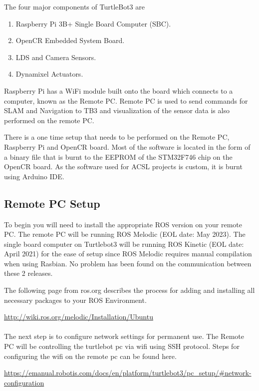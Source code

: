 \documentclass[12]{article}
\begin{document}
The four major components of TurtleBot3 are 
\begin{enumerate}
	\item {Raspberry Pi 3B+ Single Board Computer (SBC).}
	\item {OpenCR Embedded System Board.}
	\item {LDS and Camera Sensors.}
	\item {Dynamixel Actuators.}
\end{enumerate}

Raspberry Pi has a WiFi module built onto the board which connects to a computer, known as the Remote PC. Remote PC is used to send commands for SLAM and Navigation to TB3 and visualization of the sensor data is also performed on the remote PC.

There is a one time setup that needs to be performed on the Remote PC, Raspberry Pi and OpenCR board. Most of the software is located in the form of a binary file that is burnt to the EEPROM of the STM32F746 chip on the OpenCR board. As the software used for ACSL projects is custom, it is burnt using Arduino IDE.
 
\subsection{Remote PC Setup}

To begin you will need to install the appropriate ROS version on your remote PC. The remote PC will be running ROS Melodic (EOL date: May 2023). 
The single board computer on Turtlebot3 will be running ROS Kinetic (EOL date: April 2021) for the ease of setup since ROS Melodic requires manual compilation when using Rasbian. No problem has been found on the communication between these 2 releases. 

The following page from ros.org describes the process for adding and installing all necessary packages to your ROS Environment.

\url{http://wiki.ros.org/melodic/Installation/Ubuntu} \\\\

The next step is to configure network settings for permanent use. The Remote PC will be controlling the turtlebot pc via wifi using SSH protocol. Steps for configuring the wifi on the remote pc can be found here.

\url {https://emanual.robotis.com/docs/en/platform/turtlebot3/pc_setup/#network-configuration} \\
\end{document}
